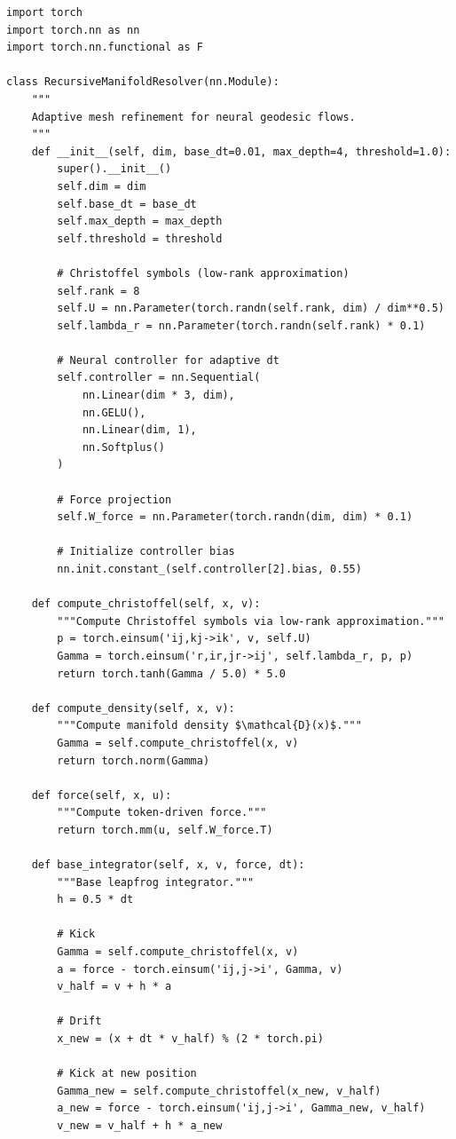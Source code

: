 \documentclass[12pt,letterpaper,twoside]{article}
\begin{document}
\begin{verbatim}
import torch
import torch.nn as nn
import torch.nn.functional as F

class RecursiveManifoldResolver(nn.Module):
    """
    Adaptive mesh refinement for neural geodesic flows.
    """
    def __init__(self, dim, base_dt=0.01, max_depth=4, threshold=1.0):
        super().__init__()
        self.dim = dim
        self.base_dt = base_dt
        self.max_depth = max_depth
        self.threshold = threshold
        
        # Christoffel symbols (low-rank approximation)
        self.rank = 8
        self.U = nn.Parameter(torch.randn(self.rank, dim) / dim**0.5)
        self.lambda_r = nn.Parameter(torch.randn(self.rank) * 0.1)
        
        # Neural controller for adaptive dt
        self.controller = nn.Sequential(
            nn.Linear(dim * 3, dim),
            nn.GELU(),
            nn.Linear(dim, 1),
            nn.Softplus()
        )
        
        # Force projection
        self.W_force = nn.Parameter(torch.randn(dim, dim) * 0.1)
        
        # Initialize controller bias
        nn.init.constant_(self.controller[2].bias, 0.55)
    
    def compute_christoffel(self, x, v):
        """Compute Christoffel symbols via low-rank approximation."""
        p = torch.einsum('ij,kj->ik', v, self.U)
        Gamma = torch.einsum('r,ir,jr->ij', self.lambda_r, p, p)
        return torch.tanh(Gamma / 5.0) * 5.0
    
    def compute_density(self, x, v):
        """Compute manifold density $\mathcal{D}(x)$."""
        Gamma = self.compute_christoffel(x, v)
        return torch.norm(Gamma)
    
    def force(self, x, u):
        """Compute token-driven force."""
        return torch.mm(u, self.W_force.T)
    
    def base_integrator(self, x, v, force, dt):
        """Base leapfrog integrator."""
        h = 0.5 * dt
        
        # Kick
        Gamma = self.compute_christoffel(x, v)
        a = force - torch.einsum('ij,j->i', Gamma, v)
        v_half = v + h * a
        
        # Drift
        x_new = (x + dt * v_half) % (2 * torch.pi)
        
        # Kick at new position
        Gamma_new = self.compute_christoffel(x_new, v_half)
        a_new = force - torch.einsum('ij,j->i', Gamma_new, v_half)
        v_new = v_half + h * a_new
        

\end{verbatim}
\end{document}
